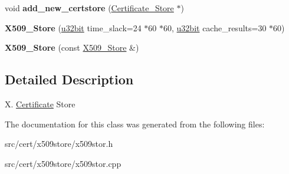 \begin{DoxyCompactItemize}
\item 
\hypertarget{classBotan_1_1X509__Store_a9f1bc993ab941a2e38fec9557fbdc26c}{void {\bfseries add\-\_\-new\-\_\-certstore} (\hyperlink{classBotan_1_1Certificate__Store}{Certificate\-\_\-\-Store} $\ast$)}\label{classBotan_1_1X509__Store_a9f1bc993ab941a2e38fec9557fbdc26c}

\item 
\hypertarget{classBotan_1_1X509__Store_a32464a5eb402a47a28197954221edb51}{{\bfseries X509\-\_\-\-Store} (\hyperlink{namespaceBotan_aacc7d03c95e97e76168fc1c819031830}{u32bit} time\-\_\-slack=24 $\ast$60 $\ast$60, \hyperlink{namespaceBotan_aacc7d03c95e97e76168fc1c819031830}{u32bit} cache\-\_\-results=30 $\ast$60)}\label{classBotan_1_1X509__Store_a32464a5eb402a47a28197954221edb51}

\item 
\hypertarget{classBotan_1_1X509__Store_a9f86058cf58cc8c2a5c84d7bcf8f1d6b}{{\bfseries X509\-\_\-\-Store} (const \hyperlink{classBotan_1_1X509__Store}{X509\-\_\-\-Store} \&)}\label{classBotan_1_1X509__Store_a9f86058cf58cc8c2a5c84d7bcf8f1d6b}

\end{DoxyCompactItemize}


\subsection{Detailed Description}
X. \hyperlink{classBotan_1_1Certificate}{Certificate} Store 

The documentation for this class was generated from the following files\-:\begin{DoxyCompactItemize}
\item 
src/cert/x509store/x509stor.\-h\item 
src/cert/x509store/x509stor.\-cpp\end{DoxyCompactItemize}
